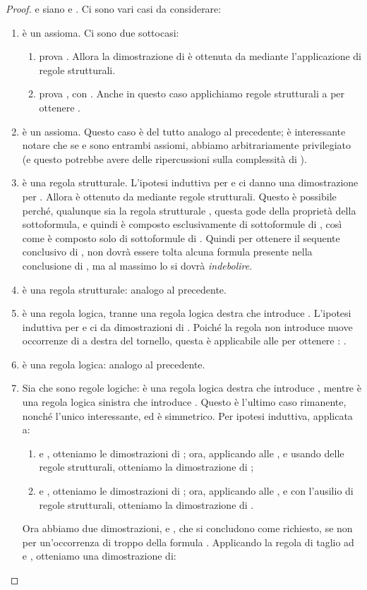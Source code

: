 \documentclass[12pt,a4paper,openright,twoside]{report}
\begin{document}
\begin{proof}
e siano  e . Ci sono vari casi da considerare:
\begin{enumerate}
	\item  \`e un assioma. Ci sono due sottocasi:
	\begin{enumerate}
		\item  prova . Allora la dimostrazione  di  \`e ottenuta da  mediante l'applicazione di regole strutturali.
		\item  prova , con . Anche in questo caso applichiamo regole strutturali a  per ottenere .
	\end{enumerate}
	\item  \`e un assioma. Questo caso \`e del tutto analogo al precedente; \`e interessante notare che se  e  sono entrambi assiomi, abbiamo arbitrariamente privilegiato  (e questo potrebbe avere delle ripercussioni sulla complessit\`a di ).
	\item  \`e una regola strutturale. L'ipotesi induttiva per  e  ci danno una dimostrazione  per . Allora  \`e ottenuto da  mediante regole strutturali. Questo \`e possibile perch\'e, qualunque sia la regola strutturale , questa gode della propriet\`a della sottoformula, e quindi  \`e composto esclusivamente di sottoformule di , cos\`i come  \`e composto solo di sottoformule di . Quindi per ottenere il sequente conclusivo di , non dovr\`a essere tolta alcuna formula presente nella conclusione di , ma al massimo lo si dovr\`a \emph{indebolire}.
	\item  \`e una regola strutturale: analogo al precedente. 
	\item  \`e una regola logica, tranne una regola logica destra che introduce . L'ipotesi induttiva per  e  ci da  dimostrazioni  di . Poich\'e la regola  non introduce nuove occorrenze di  a destra del tornello, questa \`e applicabile alle  per ottenere : .
	\item  \`e una regola logica: analogo al precedente. 
	\item Sia  che  sono regole logiche:  \`e una regola logica destra che introduce , mentre  \`e una regola logica sinistra che introduce . Questo \`e l'ultimo caso rimanente, nonch\'e l'unico interessante, ed \`e simmetrico. Per ipotesi induttiva, applicata a:
	\begin{enumerate}
		\item  e , otteniamo le dimostrazioni  di ; ora, applicando  alle , e usando delle regole strutturali, otteniamo la dimostrazione  di ;
		\item  e , otteniamo le dimostrazioni  di ; ora, applicando  alle , e con l'ausilio di regole strutturali, otteniamo la dimostrazione  di .
	\end{enumerate}
	Ora abbiamo due dimostrazioni,  e , che si concludono come richiesto, se non per un'occorrenza di troppo della formula . Applicando la regola di taglio ad  e , otteniamo una dimostrazione  di:


\end{enumerate}
\end{proof}
\end{document}
